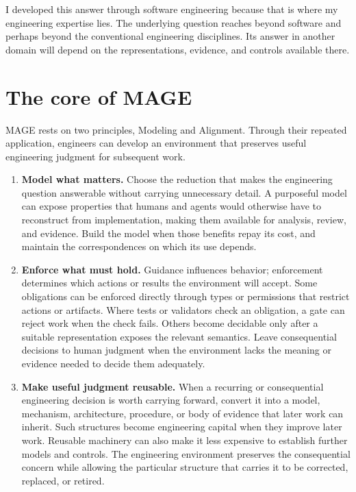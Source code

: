 I developed this answer through software engineering because that is where my engineering expertise lies. The underlying question reaches beyond software and perhaps beyond the conventional engineering disciplines. Its answer in another domain will depend on the representations, evidence, and controls available there.

\section{The core of MAGE}\label{heading:the-core-of-mage}

MAGE rests on two principles, Modeling and Alignment. Through their repeated application, engineers can develop an environment that preserves useful engineering judgment for subsequent work.

\begin{enumerate}
\def\labelenumi{\arabic{enumi}.}
\tightlist
\item
  \textbf{Model what matters.} Choose the reduction that makes the engineering question answerable without carrying unnecessary detail. A purposeful model can expose properties that humans and agents would otherwise have to reconstruct from implementation, making them available for analysis, review, and evidence. Build the model when those benefits repay its cost, and maintain the correspondences on which its use depends.
\item
  \textbf{Enforce what must hold.} Guidance influences behavior; enforcement determines which actions or results the environment will accept. Some obligations can be enforced directly through types or permissions that restrict actions or artifacts. Where tests or validators check an obligation, a gate can reject work when the check fails. Others become decidable only after a suitable representation exposes the relevant semantics. Leave consequential decisions to human judgment when the environment lacks the meaning or evidence needed to decide them adequately.
\item
  \textbf{Make useful judgment reusable.} When a recurring or consequential engineering decision is worth carrying forward, convert it into a model, mechanism, architecture, procedure, or body of evidence that later work can inherit. Such structures become engineering capital when they improve later work. Reusable machinery can also make it less expensive to establish further models and controls. The engineering environment preserves the consequential concern while allowing the particular structure that carries it to be corrected, replaced, or retired.
\end{enumerate}


